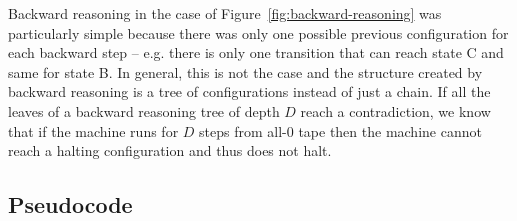 Backward reasoning in the case of Figure~\ref{fig:backward-reasoning} was particularly simple because there was only one possible previous configuration for each backward step -- e.g. there is only one transition that can reach state \textcolor{colorC}{C} and same for state \textcolor{colorB}{B}. In general, this is not the case and the structure created by backward reasoning is a tree of configurations instead of just a chain. If all the leaves of a backward reasoning tree of depth $D$ reach a contradiction, we know that if the machine runs for $D$ steps from all-0 tape then the machine cannot reach a halting configuration and thus does not halt.

\subsection{Pseudocode}

